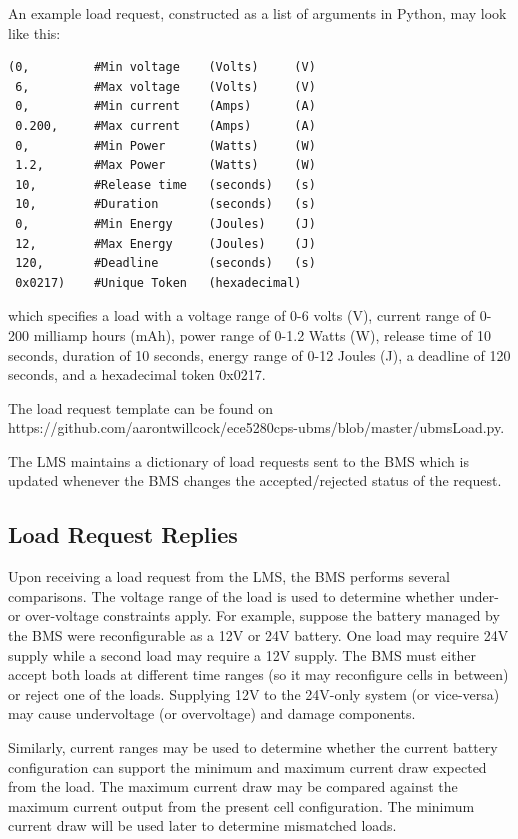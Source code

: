 \documentclass[11pt,conference,draftcls,onecolumn]{IEEEtran}
\begin{document}
An example load request, constructed as a list of arguments in Python, may look like this:
\begin{lstlisting}
(0,         #Min voltage    (Volts)     (V)
 6,         #Max voltage    (Volts)     (V)
 0,         #Min current    (Amps)      (A)
 0.200,     #Max current    (Amps)      (A)
 0,         #Min Power      (Watts)     (W)
 1.2,       #Max Power      (Watts)     (W)
 10,        #Release time   (seconds)   (s)
 10,        #Duration       (seconds)   (s)
 0,         #Min Energy     (Joules)    (J)
 12,        #Max Energy     (Joules)    (J)
 120,       #Deadline       (seconds)   (s)
 0x0217)    #Unique Token   (hexadecimal)
\end{lstlisting}
which specifies a load with a voltage range of 0-6 volts (V), current range of 0-200 milliamp hours (mAh), power range of 0-1.2 Watts (W), release time of 10 seconds, duration of 10 seconds, energy range of 0-12 Joules (J), a deadline of 120 seconds, and a hexadecimal token 0x0217.

The load request template can be found on https://github.com/aarontwillcock/ece5280cps-ubms/blob/master/ubmsLoad.py.

The LMS maintains a dictionary of load requests sent to the BMS which is updated whenever the BMS changes the accepted/rejected status of the request. 

\subsection{Load Request Replies}
Upon receiving a load request from the LMS, the BMS performs several comparisons.
The voltage range of the load is used to determine whether under- or over-voltage constraints apply.
For example, suppose the battery managed by the BMS were reconfigurable as a 12V or 24V battery. One load may require 24V supply while a second load may require a 12V supply. The BMS must either accept both loads at different time ranges (so it may reconfigure cells in between) or reject one of the loads.
Supplying 12V to the 24V-only system (or vice-versa) may cause undervoltage (or overvoltage) and damage components.

Similarly, current ranges may be used to determine whether the current battery configuration can support the minimum and maximum current draw expected from the load.
The maximum current draw may be compared against the maximum current output from the present cell configuration.
The minimum current draw will be used later to determine mismatched loads.
\end{document}
